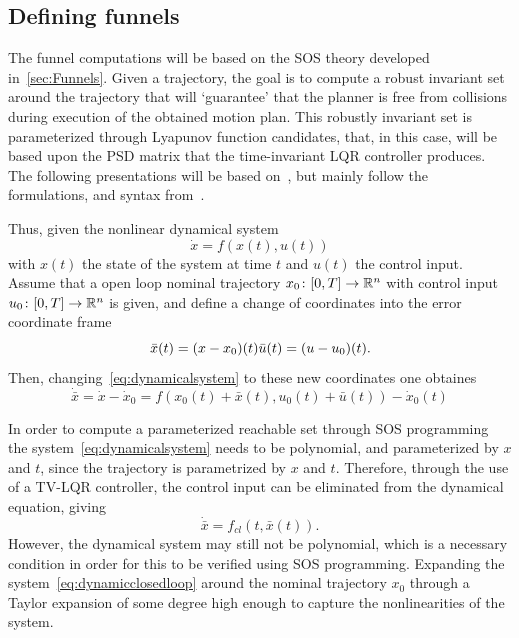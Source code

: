 \subsection{Defining funnels}

The funnel computations will be based on the \ac{SOS} theory developed
in~\ref{sec:Funnels}. Given a trajectory, the goal is to compute a robust
invariant set around the trajectory that will `guarantee' that the planner is
free from collisions during execution of the obtained motion plan. This robustly
invariant set is parameterized through Lyapunov function candidates, that, in
this case, will be based upon the \ac{PSD} matrix that the time-invariant
\ac{LQR} controller produces. The following presentations will be based
on~\cite{tobenkinInvariantFunnelsTrajectories2010,
  tedrakeLQRtreesFeedbackMotion2009, majumdarRobustOnlineMotion2013}, but mainly
follow the formulations, and syntax
from~\cite{majumdarFunnelLibrariesRealtime2017}.

Thus, given the nonlinear dynamical system
\begin{equation}
  \label{eq:dynamicalsystem}
  \dot{x} = f(x(t), u(t))
\end{equation}
with \(x(t)\) the state of the system at time \(t\) and \(u(t)\) the control
input. Assume that a open loop nominal trajectory \(x_0 \colon [0,T] \rightarrow
\mathbb{R}^n\) with control input \(u_0 \colon [0,T] \rightarrow \mathbb{R}^n\) is given, and
define a change of coordinates into the error coordinate frame
\[
  \bar{x}(t) = (x - x_0)(t) \\
  \bar{u}(t) = (u - u_0)(t).
\]
Then, changing~\ref{eq:dynamicalsystem} to these new coordinates one obtaines
\begin{equation}
  \dot{\bar{x}} = \dot{x} - \dot{x}_0 = f(x_0(t) + \bar{x}(t), u_0(t) + \bar{u}(t)) - \dot{x}_0(t)
\end{equation}

In order to compute a parameterized reachable set through \ac{SOS} programming
the system~\ref{eq:dynamicalsystem} needs to be polynomial, and parameterized by
\(x\) and \(t\), since the trajectory is parametrized by \(x\) and \(t\).
Therefore, through the use of a \ac{TV-LQR} controller, the control input can be
eliminated from the dynamical equation, giving
\begin{equation}
  \label{eq:dynamicclosedloop}
  \dot{\bar{x}} = f_{cl}(t,\bar{x}(t)).
\end{equation}
However, the dynamical system may still not be polynomial, which is a necessary
condition in order for this to be verified using \ac{SOS} programming. Expanding
the system~\ref{eq:dynamicclosedloop} around the nominal trajectory \(x_0\)
through a Taylor expansion of some degree high enough to capture the
nonlinearities of the system.

